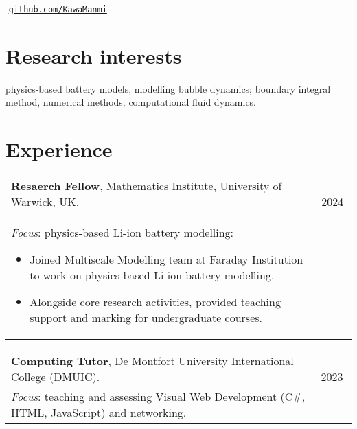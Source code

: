 \documentclass[line]{res}
\newenvironment{p1}
{\begin{adjustwidth}{-30pt}{0pt}
\vspace{8pt}}
{\end{adjustwidth}}
\newenvironment{p11}
{\begin{adjustwidth}{-25pt}{0pt}
\vspace{8pt}}
{\end{adjustwidth}}
\begin{document}



\begin{resume}
\section{}
\vspace{-15pt}
\\
\hspace*{0pt}\hfill\,\,\href{https://github.com/kawaMANMI}{\texttt{github.com/KawaManmi}}\\
\vspace{-25pt}
\noindent

\section{Research interests}
\begin{p11}
physics-based battery models, modelling bubble dynamics; boundary integral method, numerical methods; computational fluid dynamics.
\end{p11}


\section{Experience}

\begin{p1}
\begin{tabular}{p{} >{\raggedleft\arraybackslash}p{}}
	\textbf{Resaerch Fellow}, Mathematics Institute, University of Warwick, UK. & 2023--2024\\
	\textit{Focus}: physics-based Li-ion battery modelling:
	\begin{itemize}
		\item Joined Multiscale Modelling team at Faraday Institution to work on physics-based Li-ion battery modelling.
		\item Alongside core research activities, provided teaching support and marking for undergraduate courses.
	\end{itemize}
\end{tabular}

\vspace{5pt}
\begin{tabular}{p{} >{\raggedleft\arraybackslash}p{}}
	\textbf{Computing Tutor}, De Montfort University International College (DMUIC). & 2022--2023\\
	\textit{Focus}: teaching and assessing Visual Web Development (C\#, HTML, JavaScript) and  networking.
\end{tabular}




\end{p1}
\end{resume}
\end{document}
